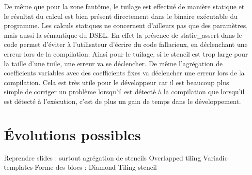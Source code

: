 De même que pour la zone fantôme, le tuilage est effectué de manière statique et le résultat du calcul est bien présent directement dans le binaire exécutable du programme. Les calculs statiques ne concernent d'ailleurs pas que des paramètres, mais aussi la sémantique du DSEL. En effet la présence de \textsf{static\_assert} dans le code permet d'éviter à l'utilisateur d'écrire du code fallacieux, en déclenchant une erreur lors de la compilation. Ainsi pour le tuilage, si le stencil est trop large pour la taille d'une tuile, une erreur va se déclencher. De même l'agrégation de coefficients variables avec des coefficients fixes va déclencher une erreur lors de la compilation. Cela est très utile pour le développeur car il est beaucoup plus simple de corriger un problème lorsqu'il est détecté à la compilation que lorsqu'il est détecté à l'exécution, c'est de plus un gain de temps dans le développement. 

\section{\'Evolutions possibles}
\label{sec:evol_biblio}

Reprendre slides : surtout agrégation de stencils
Overlapped tiling \cite{Art17}
Variadic templates \cite{Art6}
Forme des blocs : Diamond Tiling stencil \cite{Art16}


